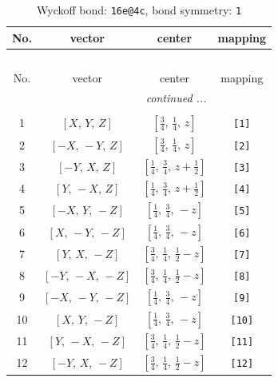 \documentclass[fleqn,8pt]{jsarticle}
\begin{document}
\begin{longtable}{cccc}
\caption{Wyckoff bond: {\tt 16e@4c}, bond symmetry: {\tt 1}}
 \\
 \hline \hline
No. & vector & center & mapping \\ \hline \endfirsthead

\multicolumn{3}{l}{\tablename\ \thetable{}} \\
 \hline \hline
No. & vector & center & mapping \\ \hline \endhead

 \hline \hline
\multicolumn{3}{r}{\footnotesize\it continued ...} \\ \endfoot

 \hline \hline
\multicolumn{3}{r}{} \\ \endlastfoot

1 & $\left[ X,\, Y,\, Z \right]$ & $\left[ \frac{3}{4},\, \frac{1}{4},\, z \right]$ & {\tt [1]} \\ \hline
2 & $\left[ - X,\, - Y,\, Z \right]$ & $\left[ \frac{3}{4},\, \frac{1}{4},\, z \right]$ & {\tt [2]} \\ \hline
3 & $\left[ - Y,\, X,\, Z \right]$ & $\left[ \frac{1}{4},\, \frac{3}{4},\, z + \frac{1}{2} \right]$ & {\tt [3]} \\ \hline
4 & $\left[ Y,\, - X,\, Z \right]$ & $\left[ \frac{1}{4},\, \frac{3}{4},\, z + \frac{1}{2} \right]$ & {\tt [4]} \\ \hline
5 & $\left[ - X,\, Y,\, - Z \right]$ & $\left[ \frac{1}{4},\, \frac{3}{4},\, - z \right]$ & {\tt [5]} \\ \hline
6 & $\left[ X,\, - Y,\, - Z \right]$ & $\left[ \frac{1}{4},\, \frac{3}{4},\, - z \right]$ & {\tt [6]} \\ \hline
7 & $\left[ Y,\, X,\, - Z \right]$ & $\left[ \frac{3}{4},\, \frac{1}{4},\, \frac{1}{2} - z \right]$ & {\tt [7]} \\ \hline
8 & $\left[ - Y,\, - X,\, - Z \right]$ & $\left[ \frac{3}{4},\, \frac{1}{4},\, \frac{1}{2} - z \right]$ & {\tt [8]} \\ \hline
9 & $\left[ - X,\, - Y,\, - Z \right]$ & $\left[ \frac{1}{4},\, \frac{3}{4},\, - z \right]$ & {\tt [9]} \\ \hline
10 & $\left[ X,\, Y,\, - Z \right]$ & $\left[ \frac{1}{4},\, \frac{3}{4},\, - z \right]$ & {\tt [10]} \\ \hline
11 & $\left[ Y,\, - X,\, - Z \right]$ & $\left[ \frac{3}{4},\, \frac{1}{4},\, \frac{1}{2} - z \right]$ & {\tt [11]} \\ \hline
12 & $\left[ - Y,\, X,\, - Z \right]$ & $\left[ \frac{3}{4},\, \frac{1}{4},\, \frac{1}{2} - z \right]$ & {\tt [12]} \\ \hline

\end{longtable}
\end{document}
